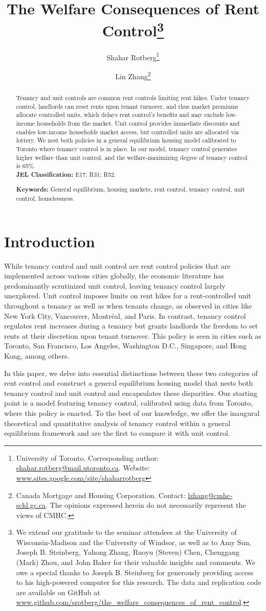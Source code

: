 \documentclass[parskip=full]{article}
\title{\vspace{-1.8cm}The Welfare Consequences of Rent Control\footnote{We extend our gratitude to the seminar attendees at the University of Wisconsin-Madison and the University of Windsor, as well as to Amy Sun, Joseph B. Steinberg, Yahong Zhang, Ruoyu (Steven) Chen, Chenggang (Mark) Zhou, and John Baker for their valuable insights and comments. We owe a special thanks to Joseph B. Steinberg for generously providing access to his high-powered computer for this research. The data and replication code are available on GitHub at \url{www.github.com/srotberg/the_welfare_consequences_of_rent_control}.}}
\author{Shahar Rotberg\footnote{University of Toronto. Corresponding author: \url{shahar.rotberg@mail.utoronto.ca}. Website: \url{www.sites.google.com/site/shaharrotberg}} \and Lin Zhang\footnote{Canada Mortgage and Housing Corporation. Contact: \url{lzhang@cmhc-schl.gc.ca}. The opinions expressed herein do not necessarily represent the views of CMHC.}}
\begin{document}
\maketitle

\begin{abstract}
\onehalfspacing
\noindent Tenancy and unit controls are common rent controls limiting rent hikes. Under tenancy control, landlords can reset rents upon tenant turnover, and thus market premiums allocate controlled units, which delays rent control's benefits and may exclude low-income households from the market. Unit control provides immediate discounts and enables low-income households market access, but controlled units are allocated via lottery. We nest both policies in a general equilibrium housing model calibrated to Toronto where tenancy control is in place. In our model, tenancy control generates higher welfare than unit control, and the welfare-maximizing degree of tenancy control is 65\%. 
\\[1.5ex]

\noindent \textbf{JEL Classification:} E17; R31; R52. 

\noindent \textbf{Keywords:} General equilibrium, housing markets, rent control,  tenancy control, unit control, homelessness.
\end{abstract}

\section{Introduction}

While tenancy control and unit control are rent control policies that are implemented across various cities globally, the economic literature has predominantly scrutinized unit control, leaving tenancy control largely unexplored. Unit control imposes limits on rent hikes for a rent-controlled unit throughout a tenancy as well as when tenants change, as observed in cities like New York City, Vancouver, Montréal, and Paris. In contrast, tenancy control regulates rent increases during a tenancy but grants landlords the freedom to set rents at their discretion upon tenant turnover. This policy is seen in cities such as Toronto, San Francisco, Los Angeles, Washington D.C., Singapore, and Hong Kong, among others.

In this paper, we delve into essential distinctions between these two categories of rent control and construct a general equilibrium housing model that nests both tenancy control and unit control and encapsulates these disparities. Our starting point is a model featuring tenancy control, calibrated using data from Toronto, where this policy is enacted. To the best of our knowledge, we offer the inaugural theoretical and quantitative analysis of tenancy control within a general equilibrium framework and are the first to compare it with unit control.
\end{document}
